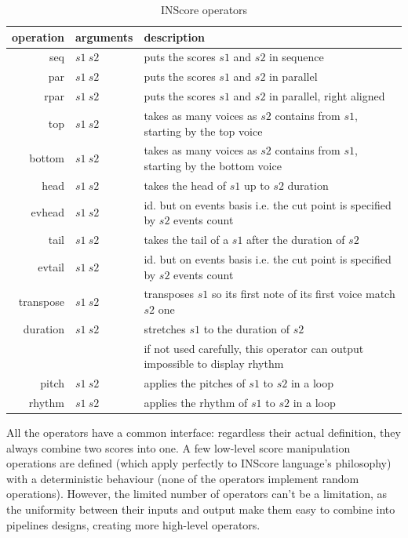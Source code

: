 \documentclass{article}
\begin{document}
\begin{table}[htdp]
\begin{center}
\begin{tabular}{rll}
\hline
operation & arguments		&	description \\
\hline
seq 	&	$s1\ s2$		& puts the scores $s1$ and $s2$ in sequence \\
par 	&	$s1\ s2$		& puts the scores $s1$ and $s2$ in parallel \\ 
rpar	&	$s1\ s2$		& puts the scores $s1$ and $s2$ in parallel, right aligned \\
top 	&	$s1\ s2$ 	& takes as many voices as $s2$ contains from $s1$, starting by the top voice \\
bottom 	&	$s1\ s2$ 	& takes as many voices as $s2$ contains from $s1$, starting by the bottom voice  \\
head	& 	$s1\ s2$	& takes the head of $s1$ up to $s2$ duration \\
evhead 	&	$s1\ s2$	& id. but on events basis i.e. the cut point is specified by $s2$ events count \\
tail	&	$s1\ s2$ 	& takes the tail of a $s1$ after the duration of $s2$ \\
evtail 	&	$s1\ s2$ 	& id. but on events basis i.e. the cut point is specified by $s2$ events count \\
transpose 	&	$s1\ s2$	& transposes $s1$ so its first note of its first voice match $s2$ one \\
duration 	&	$s1\ s2$	& stretches $s1$ to the duration of $s2$  \\
			& 	& if not used carefully, this operator can output impossible to display rhythm\\
pitch 	&	$s1\ s2$	& applies the pitches of $s1$ to $s2$ in a loop \\
rhythm 	&	$s1\ s2$	& applies the rhythm of $s1$ to $s2$ in a loop \\
\hline
\end{tabular}
\end{center}

\caption{INScore operators}
\label{operations}
\end{table}

All the operators have a common interface: regardless their actual definition, they always combine two scores into one. A few low-level score manipulation operations are defined (which apply perfectly to INScore language's philosophy) with a deterministic behaviour (none of the operators implement random operations). However, the limited number of operators can't be a limitation, as the uniformity between their inputs and output make them easy to combine into pipelines designs, creating more high-level operators.
\end{document}
